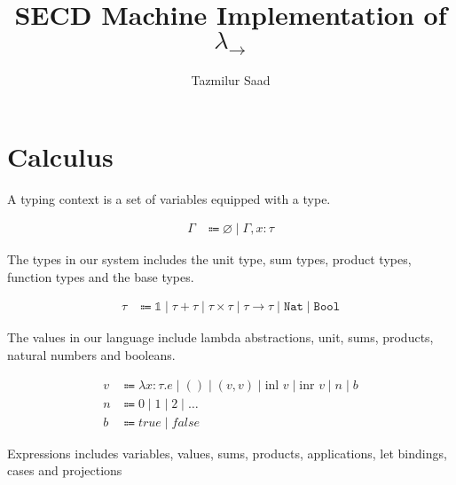 \documentclass[nonacm]{acmart}
\newcommand{\nat}{\texttt{Nat}}
\newcommand{\bool}{\texttt{Bool}}
\newcommand{\inl}[1]{\text{inl } #1}
\newcommand{\inr}[1]{\text{inr } #1}
\begin{document}
\title{SECD Machine Implementation of \(\lambda_{\rightarrow}\)}


\author{Tazmilur Saad}

\makeatletter\@printpermissionfalse\makeatother
\makeatletter\@printcopyrightfalse\makeatother


\maketitle

\section{Calculus}

A typing context is a set of variables equipped with a type.

\vspace*{-2em}
\begin{align*}
  \Gamma & \Coloneqq \varnothing \mid \Gamma, x : \tau
\end{align*}

The types in our system includes the unit type, sum types, product types, function types
and the base types.

\vspace*{-2em}
\begin{align*}
  \tau & \Coloneqq \mathds{1} \mid \tau + \tau \mid \tau \times\tau \mid \tau \rightarrow \tau \mid \nat \mid \bool
\end{align*}

The values in our language include lambda abstractions, unit, sums, products, natural numbers and booleans.

\vspace*{-2em}
\begin{align*}
  v & \Coloneqq \lambda x : \tau . e \mid () \mid (v, v) \mid \inl{v} \mid \inr{v} \mid n \mid b \\
  n & \Coloneqq 0 \mid 1 \mid 2 \mid \dots                                                       \\
  b & \Coloneqq true \mid false
\end{align*}

Expressions includes variables, values, sums, products, applications, let bindings, cases and projections
\end{document}
